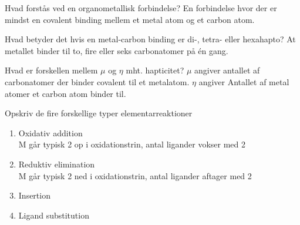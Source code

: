 
\begin{flashcard}[Teori]{Hvad forstås ved en organometallisk forbindelse?}
En forbindelse hvor der er mindst en covalent binding mellem et metal atom og et carbon atom.
\end{flashcard}

\begin{flashcard}[Teori]{Hvad betyder det hvis en metal-carbon binding er di-, tetra- eller hexahapto?}
At metallet binder til to, fire eller seks carbonatomer på én gang.
\end{flashcard}

\begin{flashcard}[Teori]{Hvad er forskellen mellem $\mu$ og $\eta$ mht. hapticitet?}
$\mu$ angiver antallet af carbonatomer der binder covalent til et metalatom. $\eta$ angiver Antallet af metal atomer et carbon atom binder til.
\end{flashcard}

\begin{flashcard}[Teori]{Opskriv de fire forskellige typer elementarreaktioner}
\begin{enumerate}
\item Oxidativ addition\\M går typisk 2 op i oxidationstrin, antal ligander vokser med 2
\item Reduktiv elimination\\ M går typisk 2 ned i oxidationstrin, antal ligander aftager med 2
\item Insertion
\item Ligand substitution
\end{enumerate}
\end{flashcard}